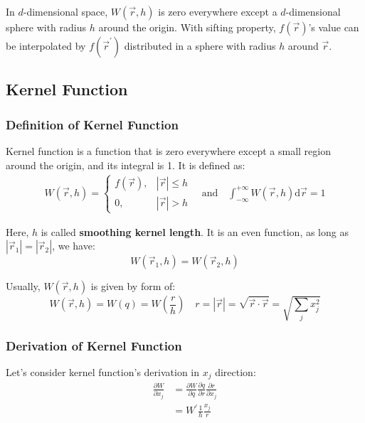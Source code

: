 In $d$-dimensional space, 
$W(\vec{r},h)$ is zero everywhere except a $d$-dimensional sphere with radius $h$ around the origin.
With sifting property, 
$f(\vec{r})$'s value can be interpolated by $f(\vec{r}^\prime)$ distributed in a sphere with radius $h$ around $\vec{r}$.

\subsection{Kernel Function}

\subsubsection{Definition of Kernel Function}

Kernel function is a function that is zero everywhere except a small region around the origin,
and its integral is 1. It is defined as:
\begin{equation}
    \begin{aligned}
        W(\vec{r},h) = 
        \begin{cases}
            f(\vec{r}), & |\vec{r}| \leq h \\
            0, & |\vec{r}| > h
        \end{cases}
        \quad \text{and} \quad
        \int_{-\infty}^{+\infty} W(\vec{r},h) \mathrm{d}\vec{r} = 1
    \end{aligned}
\end{equation}

Here, $h$ is called \textbf{smoothing kernel length}.
It is an even function, as long as $|\vec{r}_1| = |\vec{r}_2|$, 
we have:
\begin{equation}
    W(\vec{r}_1, h) = W(\vec{r}_2, h)
\end{equation}

Usually, $W(\vec{r},h)$ is given by form of:
\begin{equation}
    W(\vec{r},h) = W(q) = W\left(\frac{r}{h}\right)\quad 
    r = |\vec{r}| = \sqrt{\vec{r}\cdot\vec{r}}=\sqrt{\sum_j x_j^2}
\end{equation}

\subsubsection{Derivation of Kernel Function}

Let's consider kernel function's derivation in $x_j$ direction:
\begin{equation}
    \begin{aligned}
        \frac{\partial W}{\partial x_j}&=
        \frac{\partial W}{\partial q}\frac{\partial q}{\partial r}\frac{\partial r}{\partial x_j}\\
        &=W^\prime \frac{1}{h}\frac{x_j}{r}
    \end{aligned}
\end{equation}

